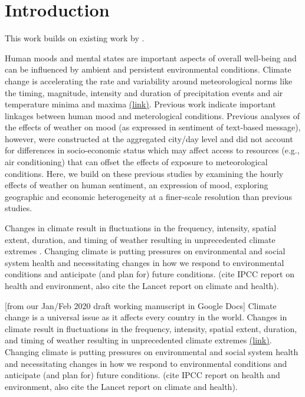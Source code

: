 \documentclass{article}
\begin{document}
    


\section{Introduction}
This work builds on existing work by \citep{baylis_weather_2018}. 


Human moods and mental states are important aspects of overall well-being and can be influenced by ambient and persistent environmental conditions. Climate change is accelerating the rate and variability around meteorological norms like the timing, magnitude, intensity and duration of precipitation events and air temperature minima and maxima \href{https://www.ipcc.ch/site/assets/uploads/2018/03/SREX-Chap3_FINAL-1.pdf}{(link)}. Previous work \citep{baylis_weather_2018} indicate important linkages between human mood and meterological conditions. Previous analyses of the effects of weather on mood (as expressed in sentiment of text-based message), however, were constructed at the aggregated city/day level and did not account for differences in socio-economic status which may affect access to resources (e.g., air conditioning) that can offset the effects of exposure to meteorological conditions. Here, we build on these previous studies by examining the hourly effects of weather on human sentiment, an expression of mood, exploring geographic and economic heterogeneity at a finer-scale resolution than previous studies.  


Changes in climate result in fluctuations in the frequency, intensity, spatial extent, duration, and timing of weather resulting in unprecedented climate extremes . Changing climate is putting pressures on environmental and social system health and necessitating changes in how we respond to environmental conditions and anticipate (and plan for) future conditions. (cite IPCC report on health and environment, also cite the Lancet report on climate and health). 

[from our Jan/Feb 2020 draft working manuscript in Google Docs]
Climate change is a universal issue as it affects every country in the world. Changes in climate result in fluctuations in the frequency, intensity, spatial extent, duration, and timing of weather resulting in unprecedented climate extremes \href{https://www.ipcc.ch/site/assets/uploads/2018/03/SREX-Chap3_FINAL-1.pdf}{(link)}. Changing climate is putting pressures on environmental and social system health and necessitating changes in how we respond to environmental conditions and anticipate (and plan for) future conditions. (cite IPCC report on health and environment, also cite the Lancet report on climate and health).
\end{document}

